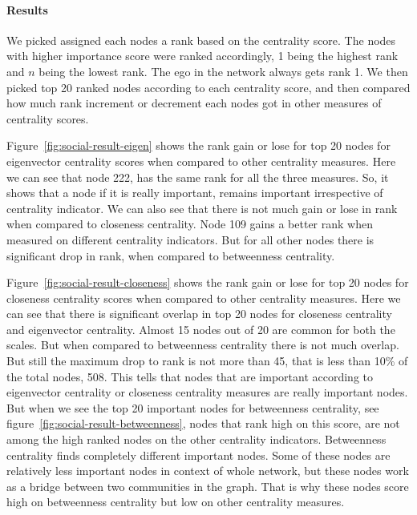 \paragraph{Results}
We picked assigned each nodes a rank based on the centrality score.
The nodes with higher importance score were ranked accordingly, 1
being the highest rank and $n$ being the lowest rank.  The ego in the
network always gets rank 1.  We then picked top 20 ranked nodes
according to each centrality score, and then compared how much rank
increment or decrement each nodes got in other measures of centrality
scores.

Figure~\ref{fig:social-result-eigen} shows the rank gain or lose for
top 20 nodes for eigenvector centrality scores when compared to other
centrality measures.  Here we can see that node 222, has the same rank
for all the three measures.  So, it shows that a node if it is really
important, remains important irrespective of centrality indicator.  We
can also see that there is not much gain or lose in rank when compared
to closeness centrality.  Node 109 gains a better rank when measured
on different centrality indicators.  But for all other nodes there is
significant drop in rank, when compared to betweenness centrality.

Figure~\ref{fig:social-result-closeness} shows the rank gain or lose for
top 20 nodes for closeness centrality scores when compared to other
centrality measures.  Here we can see that there is significant
overlap in top 20 nodes for closeness centrality and eigenvector
centrality.  Almost 15 nodes out of 20 are common for both the scales.
But when compared to betweenness centrality there is not much overlap.
But still the maximum drop to rank is not more than 45, that is less
than 10\% of the total nodes, 508.  This tells
that nodes that are important according to eigenvector centrality or
closeness centrality measures are really important nodes.  But when we
see the top 20 important nodes for betweenness centrality, see
figure~\ref{fig:social-result-betweenness}, nodes that rank high on
this score, are not among the high ranked nodes on the other
centrality indicators.  Betweenness centrality finds completely
different important nodes.  Some of these nodes are relatively less
important nodes in context of whole network, but these nodes work as a
bridge between two communities in the graph.  That is why these nodes
score high on betweenness centrality but low on other centrality
measures.




